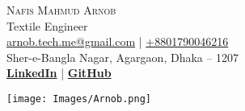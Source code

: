 
\begin{minipage}{0.70\textwidth}
    {\Huge\scshape Nafis Mahmud Arnob}\\[0.7em]
    {\Large Textile Engineer}\\[0.5em]
    \href{mailto:arnob.tech.me@gmail.com}{arnob.tech.me@gmail.com}  |  
    \href{tel:+8801790046216}{+8801790046216}
    \\ Sher-e-Bangla Nagar, Agargaon, Dhaka – 1207\\[0.7em]
    \textbf{\href{https://www.linkedin.com/in/arnob-mahmud/}{LinkedIn}}  | 
    \textbf{\href{https://github.com/ArnobMahmud}{GitHub}}
\end{minipage}
\hfill
\begin{minipage}{0.20\textwidth}
    \texttt{[image: Images/Arnob.png]}
\end{minipage}
\\[0.5em]